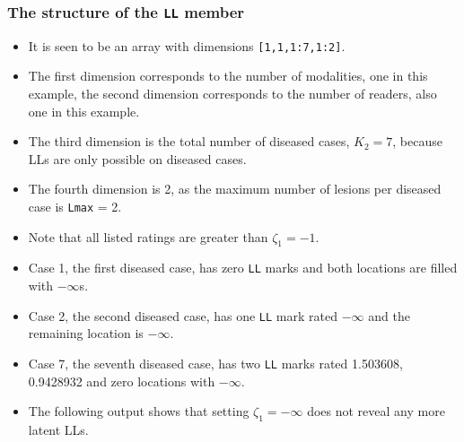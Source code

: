 \documentclass[
]{book}
\newenvironment{Shaded}{\begin{snugshade}}{\end{snugshade}}
\newcommand{\CommentTok}[1]{\textcolor[rgb]{0.56,0.35,0.01}{\textit{#1}}}
\newcommand{\DecValTok}[1]{\textcolor[rgb]{0.00,0.00,0.81}{#1}}
\newcommand{\NormalTok}[1]{#1}
\newcommand{\OperatorTok}[1]{\textcolor[rgb]{0.81,0.36,0.00}{\textbf{#1}}}
\begin{document}
\hypertarget{the-structure-of-the-ll-member}{%
\subsubsection{\texorpdfstring{The structure of the \texttt{LL} member}{The structure of the LL member}}\label{the-structure-of-the-ll-member}}

\begin{Shaded}
\end{Shaded}

\begin{itemize}
\item
  It is seen to be an array with dimensions \texttt{{[}1,1,1:7,1:2{]}}.
\item
  The first dimension corresponds to the number of modalities, one in this example, the second dimension corresponds to the number of readers, also one in this example.
\item
  The third dimension is the total number of diseased cases, \(K_2 = 7\), because LLs are only possible on diseased cases.
\item
  The fourth dimension is 2, as the maximum number of lesions per diseased case is \texttt{Lmax} = 2.
\item
  Note that all listed ratings are greater than \(\zeta_1 = -1\).
\item
  Case 1, the first diseased case, has zero \texttt{LL} marks and both locations are filled with \(-\infty\)s.
\item
  Case 2, the second diseased case, has one \texttt{LL} mark rated \ensuremath{-\infty{}} and the remaining location is \(-\infty\).
\item
  Case 7, the seventh diseased case, has two \texttt{LL} marks rated 1.503608, 0.9428932 and zero locations with \(-\infty\).
\item
  The following output shows that setting \(\zeta_1 = -\infty\) does not reveal any more latent LLs.
\end{itemize}
\end{document}
